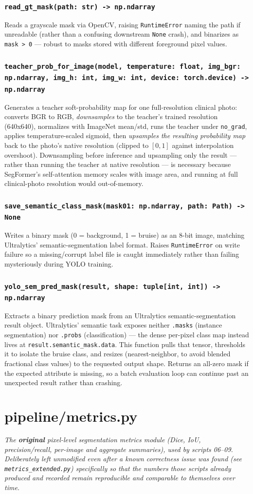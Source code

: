 \documentclass[11pt]{article}
\newcommand{\role}[1]{\par\noindent\textit{#1}\par\vspace{0.5em}}
\newcommand{\func}[1]{\subsubsection*{\texttt{#1}}}
\begin{document}
\func{read\_gt\_mask(path: str) -> np.ndarray}
Reads a grayscale mask via OpenCV, raising \texttt{RuntimeError} naming the path
if unreadable (rather than a confusing downstream \texttt{None} crash), and
binarizes as \texttt{mask > 0} --- robust to masks stored with different
foreground pixel values.

\func{teacher\_prob\_for\_image(model, temperature: float, img\_bgr: np.ndarray, img\_h: int, img\_w: int, device: torch.device) -> np.ndarray}
Generates a teacher soft-probability map for one full-resolution clinical photo:
converts BGR to RGB, \emph{downsamples} to the teacher's trained resolution
(640x640), normalizes with ImageNet mean/std, runs the teacher under
\texttt{no\_grad}, applies temperature-scaled sigmoid, then \emph{upsamples the
resulting probability map} back to the photo's native resolution (clipped to
$[0,1]$ against interpolation overshoot). Downsampling before inference and
upsampling only the result --- rather than running the teacher at native
resolution --- is necessary because SegFormer's self-attention memory scales
with image area, and running at full clinical-photo resolution would
out-of-memory.

\func{save\_semantic\_class\_mask(mask01: np.ndarray, path: Path) -> None}
Writes a binary mask (0 = background, 1 = bruise) as an 8-bit image, matching
Ultralytics' semantic-segmentation label format. Raises \texttt{RuntimeError} on
write failure so a missing/corrupt label file is caught immediately rather than
failing mysteriously during YOLO training.

\func{yolo\_sem\_pred\_mask(result, shape: tuple[int, int]) -> np.ndarray}
Extracts a binary prediction mask from an Ultralytics semantic-segmentation
result object. Ultralytics' semantic task exposes neither \texttt{.masks}
(instance segmentation) nor \texttt{.probs} (classification) --- the dense
per-pixel class map instead lives at \texttt{result.semantic\_mask.data}. This
function pulls that tensor, thresholds it to isolate the bruise class, and
resizes (nearest-neighbor, to avoid blended fractional class values) to the
requested output shape. Returns an all-zero mask if the expected attribute is
missing, so a batch evaluation loop can continue past an unexpected result
rather than crashing.

\newpage
\section{pipeline/metrics.py}
\role{The \textbf{original} pixel-level segmentation metrics module (Dice, IoU,
precision/recall, per-image and aggregate summaries), used by scripts 06--09.
Deliberately left unmodified even after a known correctness issue was found (see
\texttt{metrics\_extended.py}) specifically so that the numbers those scripts
already produced and recorded remain reproducible and comparable to themselves
over time.}
\end{document}
